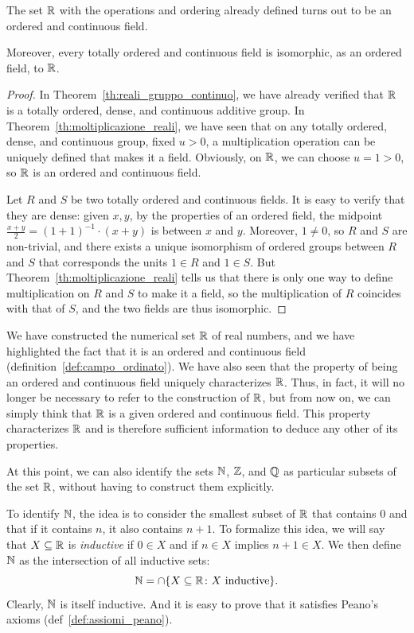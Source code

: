 \begin{theorem}
  \label{th:reali_campo}%
The set ${\mathbb R}$ with the operations and ordering already defined turns out to be
an ordered and continuous field.

Moreover, every totally ordered and continuous field is isomorphic, as an
ordered field, to ${\mathbb R}$.
\end{theorem}
\begin{proof}
In Theorem~\ref{th:reali_gruppo_continuo}, we have already verified that ${\mathbb R}$
is a totally ordered, dense, and continuous additive group. In
Theorem~\ref{th:moltiplicazione_reali}, we have seen that on any totally
ordered, dense, and continuous group, fixed $u>0$, a multiplication operation
can be uniquely defined that makes it a field. Obviously, on ${\mathbb R}$, we can
choose $u=1>0$, so ${\mathbb R}$ is an ordered and continuous field.

Let $R$ and $S$ be two totally ordered and continuous fields. It is easy to
verify that they are dense: given $x,y$, by the properties of an ordered field,
the midpoint $\frac{x+y}{2}=(1+1)^{-1}\cdot (x+y)$ is between $x$ and $y$.
Moreover, $1\neq 0$, so $R$ and $S$ are non-trivial, and there exists a unique
isomorphism of ordered groups between $R$ and $S$ that corresponds the units
$1\in R$ and $1\in S$. But Theorem~\ref{th:moltiplicazione_reali} tells us that
there is only one way to define multiplication on $R$ and $S$ to make it a
field, so the multiplication of $R$ coincides with that of $S$, and the two
fields are thus isomorphic.
\end{proof}

We have constructed the numerical set ${\mathbb R}$ of real numbers, and we have
highlighted the fact that it is an ordered and continuous field
(definition~\ref{def:campo_ordinato}). We have also seen that the property of
being an ordered and continuous field uniquely characterizes ${\mathbb R}$. Thus, in
fact, it will no longer be necessary to refer to the construction of ${\mathbb R}$, but
from now on, we can simply think that ${\mathbb R}$ is a given ordered and continuous
field. This property characterizes ${\mathbb R}$ and is therefore sufficient information
to deduce any other of its properties.

At this point, we can also identify the sets ${\mathbb N}$, ${\mathbb Z}$, and ${\mathbb Q}$ as
particular subsets of the set ${\mathbb R}$, without having to construct them
explicitly.

To identify ${\mathbb N}$, the idea is to consider the smallest subset of ${\mathbb R}$ that
contains $0$ and that if it contains $n$, it also contains $n+1$. To formalize
this idea, we will say that $X\subseteq {\mathbb R}$ is \emph{inductive} if $0\in X$ and
if $n\in X$ implies $n+1\in X$. We then define ${\mathbb N}$ as the intersection of all
inductive sets:
\[
 {\mathbb N} = \cap{\left\{ X\subseteq{\mathbb R}\colon X \text{ inductive} \right\}}.
\]
Clearly, ${\mathbb N}$ is itself inductive. And it is easy to prove that it satisfies
Peano's axioms (def~\ref{def:assiomi_peano}).

